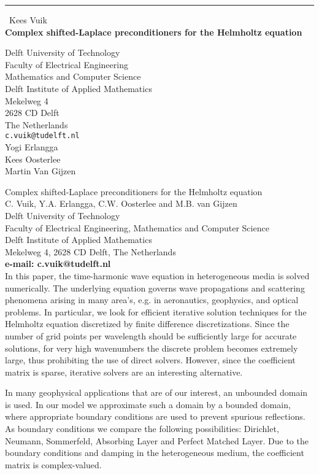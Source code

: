\documentclass{report}
\begin{document}
\begin{center}
\rule{6in}{1pt} \
{\large Kees Vuik \\
{\bf Complex shifted-Laplace preconditioners for the Helmholtz equation}}

Delft University of Technology \\ Faculty of Electrical Engineering \\ Mathematics and Computer Science \\ Delft Institute of Applied Mathematics \\ Mekelweg 4 \\ 2628 CD Delft \\ The Netherlands
\\
{\tt c.vuik@tudelft.nl}\\
Yogi Erlangga\\
Kees Oosterlee\\
	Martin Van Gijzen\end{center}

Complex shifted-Laplace preconditioners for the Helmholtz equation
\\[2ex]
C. Vuik, Y.A. Erlangga, C.W. Oosterlee and M.B. van Gijzen\\
Delft University of Technology\\
Faculty of Electrical Engineering,
Mathematics and Computer Science\\
Delft Institute of Applied Mathematics\\
Mekelweg 4,
2628 CD Delft,
The Netherlands \\
{\bf e-mail: c.vuik@tudelft.nl}\\
[2ex]
In this paper, the time-harmonic wave equation in heterogeneous media
is solved
numerically. The underlying equation governs wave propagations and
scattering
phenomena arising in many area's, e.g. in aeronautics, geophysics, and
optical
problems. In particular, we look for efficient iterative
solution techniques for the Helmholtz equation
discretized by finite difference discretizations. Since the number of
grid points per wavelength should be sufficiently large for accurate
solutions, for very high wavenumbers the discrete problem becomes
extremely large, thus prohibiting the use of direct solvers.
However, since the coefficient matrix is sparse,
iterative solvers are an interesting alternative.

In many geophysical applications that are of our interest,
an unbounded domain is used. In our model we
approximate such a domain by a bounded domain, where appropriate
boundary conditions are used to prevent spurious reflections. As
boundary conditions we compare the following possibilities:
Dirichlet, Neumann, Sommerfeld, Absorbing Layer and Perfect Matched
Layer. Due to the boundary conditions and damping in the heterogeneous
medium, the coefficient
matrix is complex-valued.
\end{document}
